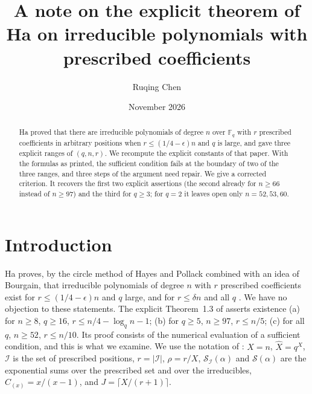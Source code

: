 \documentclass[11pt,a4paper]{amsart}
\title[Explicit prescribed coefficients]{A note on the explicit theorem of Ha on irreducible polynomials with
prescribed coefficients}
\author{Ruqing Chen}
\date{November 2026}
\theoremstyle{remark}
\newcommand{\F}{\mathbb{F}}
\newcommand{\cS}{\mathcal{S}}
\numberwithin{equation}{section}
\begin{document}
\begin{abstract}
Ha proved that there are irreducible polynomials of degree $n$ over $\F_q$ with $r$ prescribed coefficients in
arbitrary positions when $r\le(1/4-\epsilon)n$ and $q$ is large, and gave three explicit ranges of $(q,n,r)$. We
recompute the explicit constants of that paper. With the formulas as printed, the sufficient condition fails at the
boundary of two of the three ranges, and three steps of the argument need repair. We give a corrected criterion. It
recovers the first two explicit assertions (the second already for $n\ge66$ instead of $n\ge97$) and the third for
$q\ge3$; for $q=2$ it leaves open only $n=52,53,60$.
\end{abstract}

\maketitle

\section{Introduction}\label{sec:intro}

Ha \cite{Ha} proves, by the circle method of Hayes \cite{Hayes} and Pollack \cite{Pollack} combined with an idea of
Bourgain, that irreducible polynomials of degree $n$ with $r$ prescribed coefficients exist for $r\le(1/4-\epsilon)n$
and $q$ large, and for $r\le\delta n$ and all $q$ \cite[Theorem~1.1, Corollary~1.2]{Ha}. We have no objection to
these statements. The explicit Theorem~1.3 of \cite{Ha} asserts existence (a) for $n\ge8$, $q\ge16$,
$r\le n/4-\log_qn-1$; (b) for $q\ge5$, $n\ge97$, $r\le n/5$; (c) for all $q$, $n\ge52$, $r\le n/10$. Its proof
\cite[\S4]{Ha} consists of the numerical evaluation of a sufficient condition, and this is what we examine. We use
the notation of \cite{Ha}: $X=n$, $\hat X=q^X$, $\mathcal I$ is the set of prescribed positions, $r=|\mathcal I|$,
$\rho=r/X$, $\cS_{\mathcal I}(\alpha)$ and $\cS(\alpha)$ are the exponential sums over the prescribed set and over
the irreducibles, $C_{(x)}=x/(x-1)$, and $J=\lceil X/(r+1)\rceil$.
\end{document}
